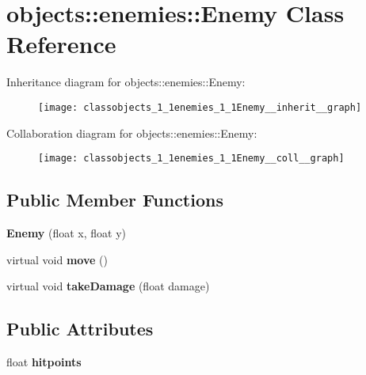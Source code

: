\hypertarget{classobjects_1_1enemies_1_1Enemy}{}\section{objects\+:\+:enemies\+:\+:Enemy Class Reference}
\label{classobjects_1_1enemies_1_1Enemy}


Inheritance diagram for objects\+:\+:enemies\+:\+:Enemy\+:\nopagebreak
\begin{figure}[H]
\begin{center}
\leavevmode
\texttt{[image: classobjects\_1\_1enemies\_1\_1Enemy\_\_inherit\_\_graph]}
\end{center}
\end{figure}


Collaboration diagram for objects\+:\+:enemies\+:\+:Enemy\+:\nopagebreak
\begin{figure}[H]
\begin{center}
\leavevmode
\texttt{[image: classobjects\_1\_1enemies\_1\_1Enemy\_\_coll\_\_graph]}
\end{center}
\end{figure}
\subsection*{Public Member Functions}
\begin{DoxyCompactItemize}
\item 
\mbox{\label{classobjects_1_1enemies_1_1Enemy_a0e3ad09de3d7cc19e5f01dd4d9424ee8}}
{\bfseries Enemy} (float x, float y)
\item 
\mbox{\label{classobjects_1_1enemies_1_1Enemy_a9a398f8d12234f02563b27440aff7891}}
virtual void {\bfseries move} ()
\item 
\mbox{\label{classobjects_1_1enemies_1_1Enemy_ae89eefd8e9478d7e4512bc24ca52a4b1}}
virtual void {\bfseries take\+Damage} (float damage)
\end{DoxyCompactItemize}
\subsection*{Public Attributes}
\begin{DoxyCompactItemize}
\item 
\mbox{\label{classobjects_1_1enemies_1_1Enemy_abb65eb4904db5b17e78037baba8c42e5}}
float {\bfseries hitpoints}
\end{DoxyCompactItemize}
